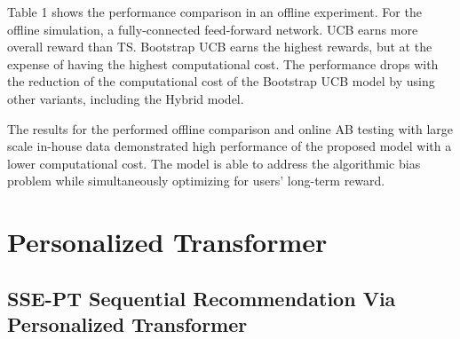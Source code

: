 Table 1 shows the performance comparison in an offline experiment. For the offline simulation, a fully-connected feed-forward network. UCB earns more overall reward than TS. Bootstrap UCB earns the highest rewards, but at the expense of having the highest computational cost. The performance drops with the reduction of
the computational cost of the Bootstrap UCB model by using other
variants, including the Hybrid model.

The results for the performed offline comparison
and online AB testing with large scale in-house data demonstrated high performance of the proposed model with a lower computational
cost. The model is able to address the algorithmic bias problem while simultaneously optimizing for users' long-term reward. 

\chapter{Personalized Transformer}
\section{SSE-PT Sequential Recommendation Via Personalized Transformer}

